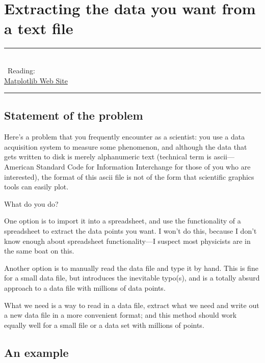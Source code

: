 \chapter{Extracting the data you want from a text file}
\label{assignment:extracting} 

\begin{flushright}
	\parbox{8cm}
		{
		\begin{flushright}
		\rule{8cm}{0.5pt}\\
		\vspace*{5mm}
		\sffamily \
		Reading:\\
		\href{http://matplotlib.sourceforge.net/}{Matplotlib Web Site}
		
		\vspace*{5mm}
		\rule{8cm}{0.5pt}
		\end{flushright}
		}
\end{flushright}


\section{Statement of the problem}\label{sec:statement01}
Here's a problem that you frequently encounter as a scientist: you use a data acquisition system to measure some phenomenon, and although the data that gets written to disk is merely alphanumeric text (technical term is ascii---American Standard Code for Information Interchange for those of you who are interested), the format of this ascii file is not of the form that scientific graphics tools can easily plot.

What do you do? 

One option is to import it into a spreadsheet, and use the functionality of a spreadsheet to extract the data points you want. I won't do this, because I don't know enough about spreadsheet functionality---I suspect most physicists are in the same boat on this. 

Another option is to manually read the data file and type it by hand. This is fine for a small data file, but introduces the inevitable typo(s), and is a totally absurd approach to a data file with millions of data points. 

What we need is a way to read in a data file, extract what we need and write out a new data file in a more convenient format; and this method should work equally well for a small file or a data set with millions of points.

\section{An example}\label{sec:example}

